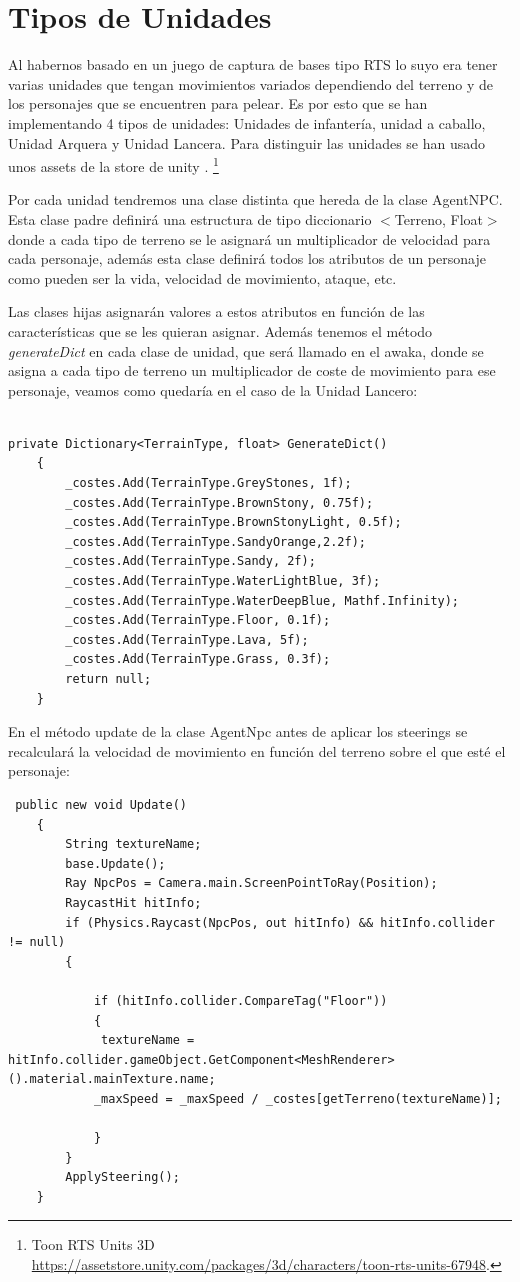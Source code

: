 \section{Tipos de Unidades}
Al habernos basado en un juego de captura de bases tipo RTS lo suyo era tener varias unidades que tengan movimientos variados dependiendo del terreno y de los personajes que se encuentren para pelear. Es por esto que se han implementando 4 tipos de unidades:
Unidades de infantería, unidad a caballo, Unidad Arquera y Unidad Lancera. Para distinguir las unidades se han usado unos assets de la store de unity .
\footnote{Toon RTS Units 3D \url{https://assetstore.unity.com/packages/3d/characters/toon-rts-units-67948}.}

Por cada unidad tendremos una clase distinta que hereda de la clase AgentNPC. Esta clase padre definirá una estructura de tipo diccionario $<$Terreno, Float$>$ donde a cada tipo de terreno se le asignará un multiplicador de velocidad para cada personaje, además esta clase definirá todos los atributos de un personaje como pueden ser la vida, velocidad de movimiento, ataque, etc.

Las clases hijas asignarán valores a estos atributos en función de las características que se les quieran asignar. Además tenemos el método \textit{generateDict} en cada clase de unidad, que será llamado en el awaka, donde se asigna a cada tipo de terreno un multiplicador de coste de movimiento para ese personaje, veamos como quedaría en el caso de la Unidad Lancero:
\begin{lstlisting}

private Dictionary<TerrainType, float> GenerateDict()
    {
        _costes.Add(TerrainType.GreyStones, 1f);
        _costes.Add(TerrainType.BrownStony, 0.75f);
        _costes.Add(TerrainType.BrownStonyLight, 0.5f);
        _costes.Add(TerrainType.SandyOrange,2.2f);
        _costes.Add(TerrainType.Sandy, 2f);
        _costes.Add(TerrainType.WaterLightBlue, 3f);
        _costes.Add(TerrainType.WaterDeepBlue, Mathf.Infinity);
        _costes.Add(TerrainType.Floor, 0.1f);
        _costes.Add(TerrainType.Lava, 5f);
        _costes.Add(TerrainType.Grass, 0.3f);
        return null;
    } \end{lstlisting}
    
En el método update de la clase AgentNpc antes de aplicar los steerings se recalculará la velocidad de movimiento en función del terreno   sobre el que esté el personaje:
\begin{lstlisting}
 public new void Update()
    {
        String textureName;
        base.Update();
        Ray NpcPos = Camera.main.ScreenPointToRay(Position);
        RaycastHit hitInfo;
        if (Physics.Raycast(NpcPos, out hitInfo) && hitInfo.collider != null)
        {

            if (hitInfo.collider.CompareTag("Floor"))
            {
             textureName = hitInfo.collider.gameObject.GetComponent<MeshRenderer>().material.mainTexture.name;
            _maxSpeed = _maxSpeed / _costes[getTerreno(textureName)];

            }
        }
        ApplySteering();
    }
\end{lstlisting}

